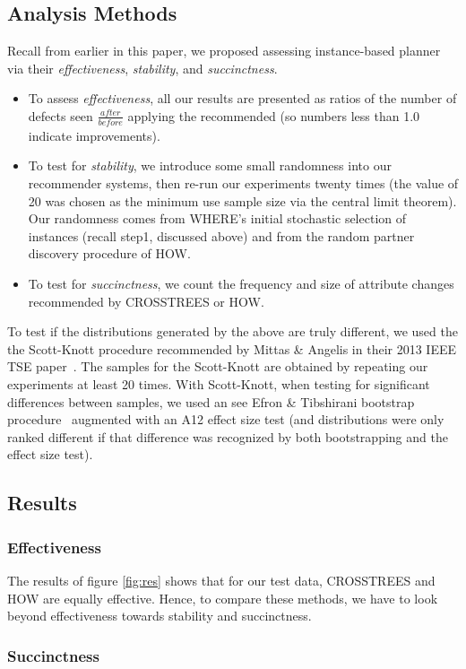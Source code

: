 \documentclass[conference]{IEEEtran}
\newcommand{\bi}{\begin{itemize}}
\newcommand{\ei}{\end{itemize}}
\begin{document}
	\subsection{Analysis Methods}
	Recall from earlier in this paper, we proposed assessing instance-based planner
	via their {\em effectiveness}, {\em stability}, and  {\em succinctness}.
\bi
\item
	To assess {\em effectiveness}, all our results are  presented as ratios of the number of defects seen $\frac{\mathit{after}}{\mathit{before}}$ applying the recommended  (so numbers less than 1.0 indicate improvements). 
	\item
	To test for {\em stability}, we introduce some small randomness into our recommender systems, then re-run our experiments twenty times (the value of 20 was chosen as the minimum use sample size via the central limit theorem). Our randomness comes from WHERE's initial stochastic selection of instances (recall step1, discussed above) and from the random partner discovery procedure of HOW.
	\item
	To test for {\em succinctness}, we count the frequency and size of attribute changes recommended by CROSSTREES or HOW.
	\ei
To test if the distributions generated by the above are truly different, we
used the the Scott-Knott procedure recommended by Mittas \& Angelis in their 2013
IEEE TSE paper~\cite{mittas13}. The samples for the Scott-Knott are  obtained by repeating our experiments at least 20 times. With Scott-Knott, when testing for significant differences between samples, we used an see Efron \&
Tibshirani bootstrap procedure~\cite[p220-223]{efron93} augmented with an A12 effect size test (and distributions were only ranked  different if that difference was recognized by
both bootstrapping and the effect size test).

\subsection{Results}
	
\subsubsection{Effectiveness}
The results of figure \ref{fig:res} shows that for our test data, CROSSTREES and HOW are equally effective. Hence, to compare these methods, we have to look
beyond effectiveness towards stability and succinctness.

\subsubsection{Succinctness}
\end{document}
